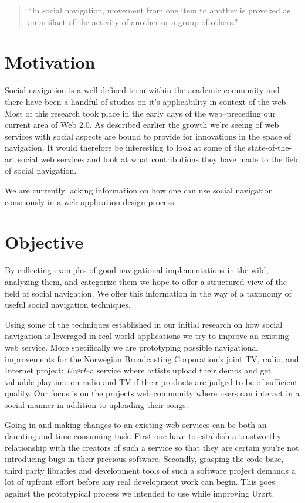 \begin{quote}
``In social navigation, movement from one item to another is provoked as an
artifact of the activity of another or a group of others.'' \citep{dourish94} 
\end{quote}

\section{Motivation}

Social navigation is a well defined term within the academic
community and there have been a handful of studies on it's applicability in
context of the web. Most of this research took place in the early days of the
web--preceding our current area of Web 2.0. As described earlier the
growth we're seeing of web services with social aspects are bound to provide
for innovations in the space of navigation. It would therefore be interesting
to look at some of the state-of-the-art social web services and look at what
contributions they have made to the field of social navigation.

We are currently lacking information on how one can use social navigation
consciously in a web application design process.

\section{Objective}

By collecting examples of good navigational implementations in the wild,
analyzing them, and categorize them we hope to offer a structured view of the
field of social navigation. We offer this information in the way of a taxonomy
of useful social navigation techniques.

Using some of the techniques established in our initial research on how social
navigation is leveraged in real world applications we try to improve an
existing web service. More specifically we are prototyping possible
navigational improvements for the Norwegian Broadcasting Corporation's joint
TV, radio, and Internet project: \emph{Ur\o{}rt}--a service where artists upload
their demos and get valuable playtime on radio and TV if their products are
judged to be of sufficient quality. Our focus is on the projects
web community where users can interact in a social manner in addition to
uploading their songs.

Going in and making changes to an existing web services can be both an
daunting and time consuming task. First one have to establish a trustworthy
relationship with the creators of such a service so that they are certain
you're not introducing bugs in their precious software. Secondly, grasping the
code base, third party libraries and development tools of such a software
project demands a lot of upfront effort before any real development work can
begin. This goes against the prototypical process we intended to use while
improving Ur\o{}rt.

